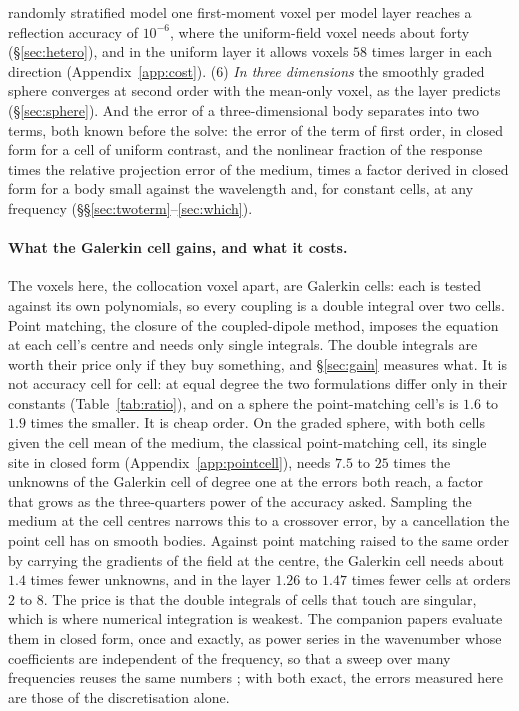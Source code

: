 \documentclass[11pt,a4paper]{article}
\begin{document}
randomly stratified model one first-moment voxel per model layer reaches a reflection accuracy of
$10^{-6}$, where the uniform-field voxel needs about forty (\S\ref{sec:hetero}), and in the uniform
layer it allows voxels $58$ times larger in each direction (Appendix~\ref{app:cost}). (6) \emph{In three
dimensions} the smoothly graded sphere converges at second order with the mean-only voxel, as the layer
predicts (\S\ref{sec:sphere}). And the error of a three-dimensional body separates into two terms, both
known before the solve: the error of the term of first order, in closed form for a cell of uniform
contrast, and the nonlinear fraction of the response times the relative projection error of the medium,
times a factor derived in closed form for a body small against the wavelength and, for constant cells,
at any frequency (\S\S\ref{sec:twoterm}--\ref{sec:which}).

\paragraph{What the Galerkin cell gains, and what it costs.} The voxels here, the collocation voxel
apart, are Galerkin cells: each is tested against its own polynomials, so every coupling is a double integral over two
cells. Point matching, the closure of the coupled-dipole method, imposes the equation at each cell's centre
and needs only single integrals. The double integrals are worth their price only if they buy something, and
\S\ref{sec:gain} measures what. It is not accuracy cell for cell: at equal degree the two formulations
differ only in their constants (Table~\ref{tab:ratio}), and on a sphere the point-matching cell's is
$1.6$ to $1.9$ times the smaller. It is cheap order. On the graded sphere, with both cells given the cell
mean of the medium, the classical point-matching cell, its single site in closed form
(Appendix~\ref{app:pointcell}), needs $7.5$ to $25$ times the unknowns of the Galerkin cell of degree one
at the errors both reach, a factor that grows as the three-quarters power of the accuracy asked. Sampling
the medium at the cell centres narrows this to a crossover error, by a cancellation the point cell has on
smooth bodies. Against point matching raised to the same order by carrying the gradients of the field at the
centre, the Galerkin cell needs about $1.4$ times fewer unknowns, and in the layer $1.26$ to $1.47$ times fewer
cells at orders $2$ to $8$. The price is
that the double integrals of cells that touch are singular, which is where numerical integration is weakest.
The companion papers evaluate them in closed form, once and exactly, as power series in the wavenumber whose
coefficients are independent of the frequency, so that a sweep over many frequencies reuses the same
numbers \citep{NestorLegendre2026,NestorCoupling2026}; with both exact, the errors measured here are those
of the discretisation alone.
\end{document}
